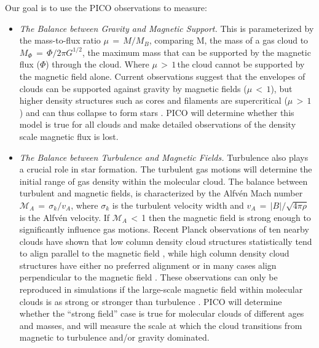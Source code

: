 \documentclass[PICOReport.tex]{subfiles}
\begin{document}
Our goal is to use the PICO observations to measure:
\begin{itemize}
\item {\em The Balance between Gravity and Magnetic Support.} This is parameterized by the mass-to-flux ratio $\mu\,=\,M/M_{B}$, comparing M, the mass of a gas cloud to $M_{\Phi}\,=\,\Phi/2\pi G^{1/2}$, the maximum mass that can be supported by the magnetic flux ($\Phi$) through the cloud.
Where $\mu\,>\,1$\,the cloud cannot be supported by the magnetic field alone.
Current observations suggest that the envelopes of clouds can be supported against gravity by magnetic fields ($\mu\,<\,1$), but higher density structures such as cores and filaments are supercritical ($\mu\,>\,1$) and can thus collapse to form stars \citep{Crutcher2010}.  PICO will determine whether this model is true for all clouds and make detailed observations of the density scale magnetic flux is lost.
\item {\em The Balance between Turbulence and Magnetic Fields.} Turbulence also plays a crucial role in star formation. The turbulent gas motions will determine the initial range of gas density within the molecular cloud.  The balance between turbulent and magnetic fields, is characterized by the Alfv\'{e}n Mach number $\mathcal{M}_A\,=\,\sigma_k/v_A$, where $\sigma_k$ is the turbulent velocity width and $v_A\,=\,|B|/\sqrt{4\pi\rho}$ is the Alfv\'{e}n velocity.  If $\mathcal{M}_A\,<\,$1 then the magnetic field is strong enough to significantly influence gas motions. Recent Planck observations of ten nearby clouds have shown that low column density cloud structures statistically tend to align parallel to the magnetic field \cite{Planck:XXXII}, while high column density cloud structures have either no preferred alignment or in many cases align perpendicular to the magnetic field \citep{Planck:XXXV}.  These observations can only be reproduced in simulations if the large-scale magnetic field within molecular clouds is as strong or stronger than turbulence \citep{Soler2013,Chen2016,Mocz2018}.  PICO will determine whether the ``strong field'' case is true for molecular clouds of different ages and masses, and will measure the scale at which the cloud transitions from magnetic to turbulence and/or gravity dominated.
\end{itemize}
\end{document}
